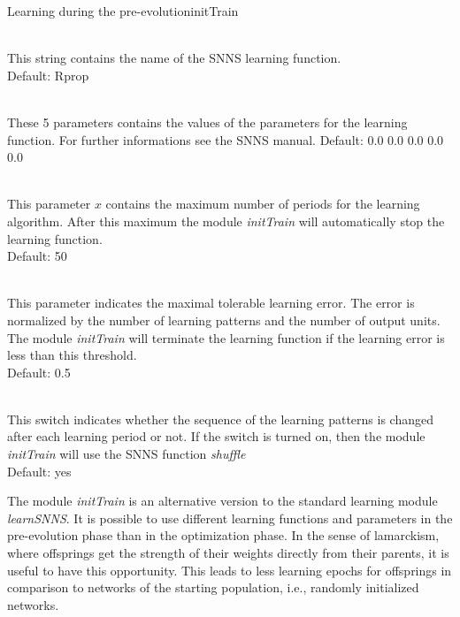 \begin{moduledoc}{Learning during the pre-evolution}{initTrain}
  \item[\KeyWord{initLearnfct} \optParam{ x } ]~\\
    This string contains the name of the SNNS learning function.\\
    Default: Rprop
  \item[\KeyWord{initLearnparam} \optParam{ x } ]~\\
    These 5 parameters contains the values of the parameters for the 
    learning function.
    For further informations see the SNNS manual.
    Default: 0.0 0.0 0.0 0.0 0.0
  \item[\KeyWord{initMaxepochs} \optParam{ x } ]~\\
    This parameter $x$ contains the maximum number of periods for the learning 
    algorithm. After this maximum the module {\it initTrain} will automatically stop the 
    learning function.\\
    Default: 50
  \item[\KeyWord{initMaxtss} \optParam{ x } ]~\\
    This parameter indicates the maximal tolerable learning error.
    The error is normalized by the number of learning patterns and the number of output units.
    The module {\it initTrain} will terminate the learning function if the learning error
    is less than this threshold.\\
    Default: 0.5
  \item[\KeyWord{initShuffle} \optParam{ x } ]~\\
    This switch indicates whether the sequence of the learning patterns is changed after
    each learning period or not.
    If the switch is turned on, then the module {\it initTrain} will use the
    SNNS function {\it shuffle}\\
    Default: yes
\end{moduledoc}

The module {\it initTrain} is an alternative version to the standard learning 
module {\it learnSNNS}. It is possible to use different learning functions and 
parameters in the pre-evolution phase than in the optimization phase.
In the sense of lamarckism, where offsprings get the strength of their 
weights directly from their parents, it is useful to have this opportunity.
This leads to less learning epochs for offsprings in comparison to networks
of the starting population, i.e., randomly initialized networks.


